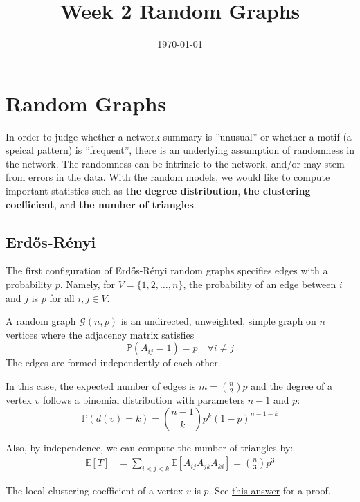 \documentclass{article}
\title{Week 2 Random Graphs}
\date{\today}
\begin{document}
\maketitle

\section{Random Graphs}
In order to judge whether a network summary is ”unusual” or whether a motif (a speical pattern) is ”frequent”, there is an underlying assumption of randomness in the network. The randomness can be intrinsic to the network, and/or may stem from errors in the data. With the random models, we would like to compute important statistics such as \textbf{the degree distribution}, \textbf{the clustering coefficient}, and \textbf{the number of triangles}.

\subsection{Erd\H{o}s-R\'{e}nyi}
The first configuration of Erd\H{o}s-R\'{e}nyi random graphs specifies edges with a probability $p$. Namely, for $V=\{1,2,\ldots,n\}$, the probability of an edge between $i$ and $j$ is $p$ for all $i,j\in V$.
\begin{definition}
    A random graph $\mathcal{G}(n,p)$ is an undirected, unweighted, simple graph on $n$ vertices where the adjacency matrix satisfies
    \begin{equation*}
        \mathbb{P}(A_{ij}=1)=p \quad \forall i \neq j
    \end{equation*}
    The edges are formed independently of each other.
\end{definition}

In this case, the expected number of edges is $m=\binom{n}{2}p$ and the degree of a vertex $v$ follows a binomial distribution with parameters $n-1$ and $p$:
\[
\mathbb{P}(d(v)=k)=\binom{n-1}{k}p^k(1-p)^{n-1-k}
\]

Also, by independence, we can compute the number of triangles by:
\begin{align*}
    \mathbb{E}[T]&=\sum_{i<j<k} \mathbb{E}[A_{ij}A_{jk}A_{ki}]=\binom{n}{3}p^3
\end{align*}

\begin{unexaminable}
    The local clustering coefficient of a vertex $v$ is $p$. See \href{https://math.stackexchange.com/questions/2200452/expected-local-clustering-coefficient-for-a-node-in-a-network}{this answer} for a proof.
\end{unexaminable}
\end{document}
